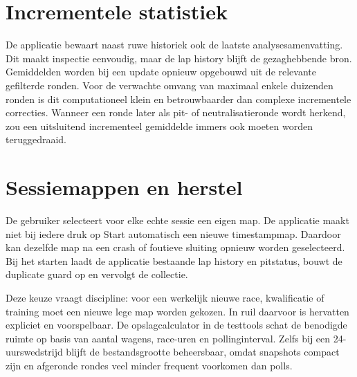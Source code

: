 \section{Incrementele statistiek}
De applicatie bewaart naast ruwe historiek ook de laatste analysesamenvatting. Dit maakt inspectie eenvoudig, maar de lap history blijft de gezaghebbende bron. Gemiddelden worden bij een update opnieuw opgebouwd uit de relevante gefilterde ronden. Voor de verwachte omvang van maximaal enkele duizenden ronden is dit computationeel klein en betrouwbaarder dan complexe incrementele correcties. Wanneer een ronde later als pit- of neutralisatieronde wordt herkend, zou een uitsluitend incrementeel gemiddelde immers ook moeten worden teruggedraaid.

\section{Sessiemappen en herstel}
De gebruiker selecteert voor elke echte sessie een eigen map. De applicatie maakt niet bij iedere druk op Start automatisch een nieuwe timestampmap. Daardoor kan dezelfde map na een crash of foutieve sluiting opnieuw worden geselecteerd. Bij het starten laadt de applicatie bestaande lap history en pitstatus, bouwt de duplicate guard op en vervolgt de collectie.

Deze keuze vraagt discipline: voor een werkelijk nieuwe race, kwalificatie of training moet een nieuwe lege map worden gekozen. In ruil daarvoor is hervatten expliciet en voorspelbaar. De opslagcalculator in de testtools schat de benodigde ruimte op basis van aantal wagens, race-uren en pollinginterval. Zelfs bij een 24-uurswedstrijd blijft de bestandsgrootte beheersbaar, omdat snapshots compact zijn en afgeronde rondes veel minder frequent voorkomen dan polls.

